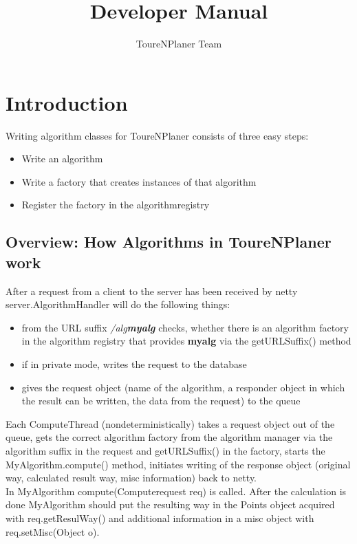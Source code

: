 \documentclass[ngerman,titlepage,parskip=true]{scrartcl}
\title{Developer Manual}
\author{ToureNPlaner Team}
\begin{document}
\maketitle

\tableofcontents

\pagebreak

\section{Introduction}

Writing algorithm classes for ToureNPlaner consists of three easy steps:
\begin{itemize}
  \item Write an algorithm
  \item Write a factory that creates instances of that algorithm
  \item Register the factory in the algorithmregistry
\end{itemize}


  \subsection{Overview: How Algorithms in ToureNPlaner work}
  After a request from a client to the server has been received by netty server.AlgorithmHandler will do the following things:
  \begin{itemize}
    \item from the URL suffix \textit{/alg\textbf{myalg}} checks, whether there is an algorithm factory in the algorithm registry that provides \textbf{myalg} via the getURLSuffix() method
    \item if in private mode, writes the request to the database
    \item gives the request object (name of the algorithm, a responder object in which the result can be written, the data from the request) to the queue
  \end{itemize}
  Each ComputeThread (nondeterministically) takes a request object out of the queue, gets the correct algorithm factory from the algorithm manager via the algorithm suffix in the request and getURLSuffix() in the factory, starts the MyAlgorithm.compute() method, initiates writing of the response object (original way, calculated result way, misc information) back to netty.\\
  In MyAlgorithm compute(Computerequest req) is called. After the calculation is done MyAlgorithm should put the resulting way in the Points object acquired with req.getResulWay() and additional information in a misc object with req.setMisc(Object o).
\end{document}
